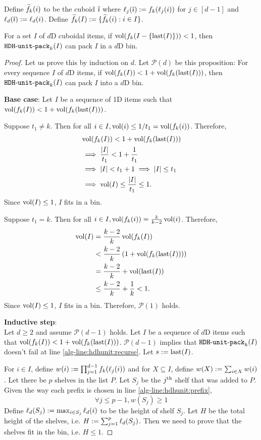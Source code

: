 Define $\widetilde{f}_{k}(i)$ to be the cuboid $\tilde{\imath}$ where $\ell_j(\tilde{\imath}) := f_k(\ell_j(i))$
for $j \in [d-1]$ and $\ell_d(\tilde{\imath}) := \ell_d(i)$.
Define $\widetilde{f}_{k}(I) := \{\widetilde{f}_{k}(i): i \in I\}$.

\begin{theorem}[Correctness]
\label{thm:hdhkunit}
For a set $I$ of $d$D cuboidal items, if $\operatorname{vol}(f_k(I-\{\operatorname{last}(I)\})) < 1$,
then $\operatorname{\mathtt{HDH-unit-pack}}_{k}(I)$ can pack $I$ in a $d$D bin.
\end{theorem}
\begin{proof}
Let us prove this by induction on $d$.
Let $\mathcal{P}(d)$ be this proposition:
For every sequence $I$ of $d$D items, if $\operatorname{vol}(f_k(I)) < 1 + \operatorname{vol}(f_k(\operatorname{last}(I)))$,
then $\operatorname{\mathtt{HDH-unit-pack}}_{k}(I)$ can pack $I$ into a $d$D bin.

\textbf{Base case}:
Let $I$ be a sequence of 1D items such that $\operatorname{vol}(f_k(I)) < 1 + \operatorname{vol}(f_k(\operatorname{last}(I)))$.

Suppose $t_1 \neq k$.
Then for all $i \in I, \operatorname{vol}(i) \le 1/t_1 = \operatorname{vol}(f_k(i))$. Therefore,
\begin{align*}
& \operatorname{vol}(f_k(I)) < 1 + \operatorname{vol}(f_k(\operatorname{last}(I)))
\\ &\implies \frac{|I|}{t_1} < 1 + \frac{1}{t_1}
\\ &\implies |I| < t_1 + 1 \implies |I| \le t_1
\\ &\implies \operatorname{vol}(I) \le \frac{|I|}{t_1} \le 1.
\end{align*}
Since $\operatorname{vol}(I) \le 1$, $I$ fits in a bin.

Suppose $t_1 = k$.
Then for all $i \in I, \operatorname{vol}(f_k(i)) = \frac{k}{k-2}\operatorname{vol}(i)$. Therefore,
\begin{align*}
\operatorname{vol}(I) &= \frac{k-2}{k}\operatorname{vol}(f_k(I))
\\ &< \frac{k-2}{k}\left( 1 + \operatorname{vol}(f_k(\operatorname{last}(I)))\right)
\\ &= \frac{k-2}{k} + \operatorname{vol}(\operatorname{last}(I))
\\ &\le \frac{k-2}{k} + \frac{1}{k} < 1.
\end{align*}
Since $\operatorname{vol}(I) \le 1$, $I$ fits in a bin.
Therefore, $\mathcal{P}(1)$ holds.

\textbf{Inductive step}:\\
Let $d \ge 2$ and assume $\mathcal{P}(d-1)$ holds.
Let $I$ be a sequence of $d$D items such that $\operatorname{vol}(f_k(I)) < 1 + \operatorname{vol}(f_k(\operatorname{last}(I)))$.
$\mathcal{P}(d-1)$ implies that $\operatorname{\mathtt{HDH-unit-pack}}_{k}(I)$ doesn't fail at
line \ref{alg-line:hdhunit:recurse}.
Let $s := \operatorname{last}(I)$.

For $i \in I$, define $w(i) := \prod_{j=1}^{d-1} f_k(\ell_j(i))$
and for $X \subseteq I$, define $w(X) := \sum_{i \in X} w(i)$.
Let there be $p$ shelves in the list $P$.
Let $S_j$ be the $j^{\textrm{th}}$ shelf that was added to $P$.
Given the way each prefix is chosen in line \ref{alg-line:hdhunit:prefix},
\begin{equation}\label{eqn:hdhunit:shelf-wide}
\forall j \le p-1, w(S_j) \ge 1 \end{equation}
Define $\ell_d(S_j) := \max_{i \in S_j} \ell_d(i)$ to be the height of shelf $S_j$.
Let $H$ be the total height of the shelves, i.e. $H := \sum_{j=1}^p \ell_d(S_j)$.
Then we need to prove that the shelves fit in the bin, i.e. $H \le 1$.


\end{proof}
